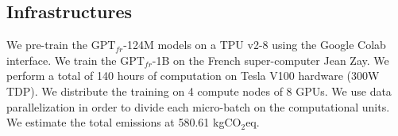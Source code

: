 \begin{table}[!ht]
\footnotesize
{}
\caption{ Statistics of the architectures and comparison with OpenAI models \parencite{radford_2018, radford_2019}.}
\end{table}

\subsection{Infrastructures}

We pre-train the $\text{GPT}_{fr}$-124M models on a TPU v2-8 using the Google Colab interface. We train the $\text{GPT}_{fr}$-1B on the French super-computer Jean Zay. We perform a total of 140 hours of computation on Tesla V100 hardware (300W TDP). We distribute the training on 4 compute nodes of 8 GPUs. We use data parallelization in order to divide each micro-batch on the computational units. We estimate the total emissions at 580.61 kgCO$_2$eq.

